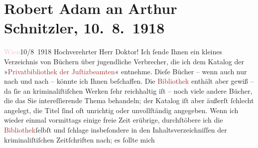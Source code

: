 

               \section[Robert Adam an Arthur Schnitzler, 10. 8. 1918]{ Robert Adam an Arthur Schnitzler, 10. 8. 1918}\nopagebreak{}\rehead{ }\normalsize\beginnumbering{} \toendnotes[C]{\smallbreak\pagebreak[2]} 
\toendnotes[C]{\smallbreak}\pstart
           \centering{}{\pb}\textcolor{pink}{Wien}{}\ledrightnote{\textcolor{pink}{Wien}}{ }10/8 1918\pend
           \pstart\center{}Hochverehrter Herr Doktor!\pend\pstart
           Ich ſende Ihnen ein kleines Verzeichnis von Büchern über jugendliche Verbrecher,
                    die ich dem Katalog der »\textcolor{brown}{Privatbibliothek der
                        Juſtizbeamten}{}\ledrightnote{\textcolor{brown}{Privatbibliothek der Wiener Justizbeamten}}« entnehme. Dieſe Bücher – wenn auch nur nach und nach –
                    könnte ich Ihnen beſchaffen. Die \textcolor{brown}{Bibliothek}{} enthält aber gewiß – da ſie an kriminaliſtiſchen Werken
                    ſehr reichhaltig iſt – noch viele andere Bücher, die das Sie intereſſierende
                    Thema behandeln; der Katalog iſt aber äußerſt ſchlecht angelegt, die Titel ſind
                    oft unrichtig oder {\pb}unvollſtändig
                    angegeben. Wenn ich wieder einmal vormittags einige freie Zeit erübrige,
                    durchſtöbere ich die \textcolor{brown}{Bibliothek}{}ſelbſt und ſchlage insbeſondere in den
                    Inhaltsverzeichniſſen der kriminaliſtiſchen Zeitſchriften nach; es ſollte mich
